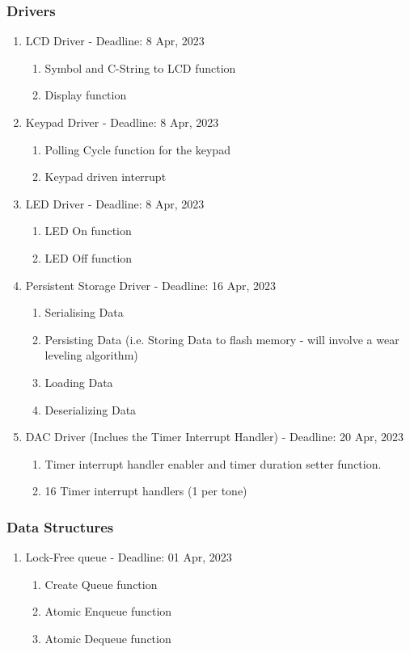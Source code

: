 \documentclass[11pt,a4paper
]{scrartcl}
\begin{document}
\subsubsection{Drivers}
\begin{enumerate}
    \item LCD Driver - Deadline: 8 Apr, 2023
    \begin{enumerate}
        \item Symbol and C-String to LCD function
        \item Display function
    \end{enumerate}
    \item Keypad Driver - Deadline: 8 Apr, 2023
    \begin{enumerate}
        \item Polling Cycle function for the keypad
        \item Keypad driven interrupt
    \end{enumerate}
    \item LED Driver - Deadline: 8 Apr, 2023
    \begin{enumerate}
        \item LED On function
        \item LED Off function
    \end{enumerate}
    \item Persistent Storage Driver - Deadline: 16 Apr, 2023
    \begin{enumerate}
        \item Serialising Data
        \item Persisting Data (i.e. Storing Data to flash memory - will involve a wear leveling algorithm)
        \item Loading Data
        \item Deserializing Data
    \end{enumerate}
    \item DAC Driver (Inclues the Timer Interrupt Handler) - Deadline: 20 Apr, 2023
    \begin{enumerate}
        \item Timer interrupt handler enabler and timer duration setter function.
        \item 16 Timer interrupt handlers (1 per tone)
    \end{enumerate}
\end{enumerate}

\subsubsection{Data Structures}
\begin{enumerate}
    \item Lock-Free queue - Deadline: 01 Apr, 2023
    \begin{enumerate}
        \item Create Queue function
        \item Atomic Enqueue function
        \item Atomic Dequeue function
    \end{enumerate}
\end{enumerate}
\end{document}
